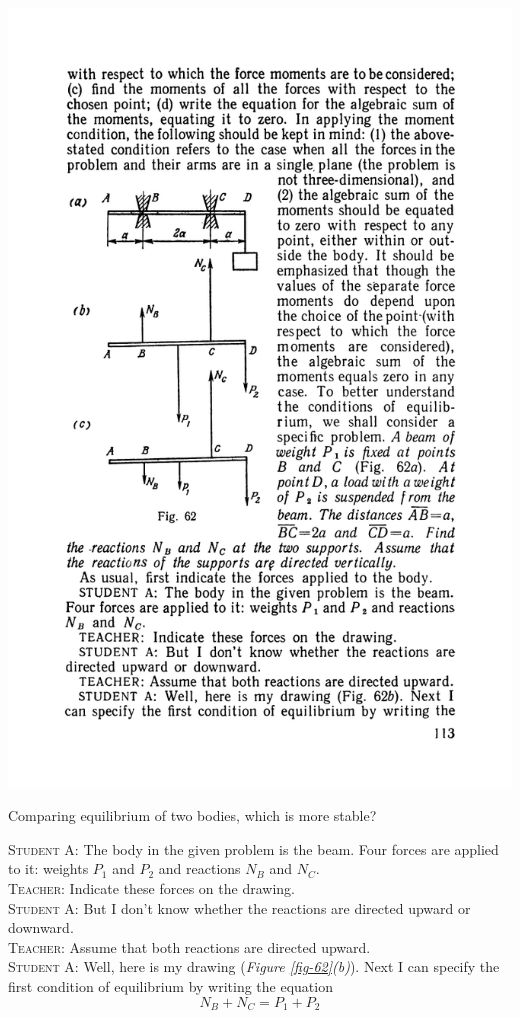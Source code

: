 \documentclass[a4paper,sfsidenotes]{tufte-book}
\begin{document}
\begin{marginfigure}[-3cm]
\centering
\includegraphics[width=\linewidth]{fig-062a.pdf}
\caption{Comparing equilibrium of two bodies, which is more stable?}
\label{fig-62}
\end{marginfigure}


\textsc{Student A:} The body in the given problem is the beam. Four forces are applied to it: weights $P_{1}$ and $P_{2}$ and reactions $N_{B}$ and $N_{C}$.
\\
\textsc{Teacher:} Indicate these forces on the drawing.
\\
\textsc{Student A:} But I don't know whether the reactions are directed upward or downward.
\\
\textsc{Teacher:} Assume that both reactions are directed upward.
\\
\textsc{Student A:} Well, here is my drawing (\emph{Figure \ref{fig-62}(b)}). Next I can specify the first condition of equilibrium by writing the equation\\
\begin{equation*}
N_{B}+N_{C}=P_{1}+P_{2}
\end{equation*}
\end{document}
